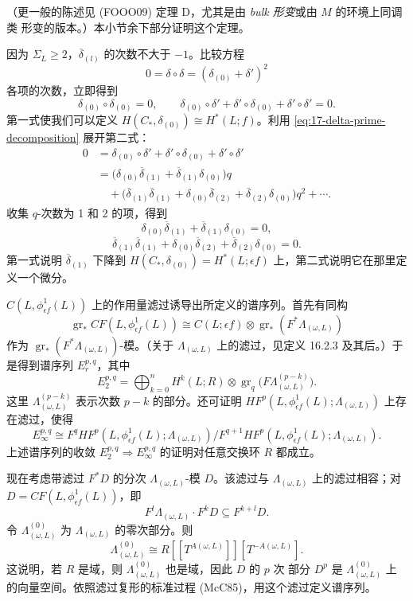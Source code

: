 （更一般的陈述见 (FOOO09) 定理 D，尤其是由 \emph{bulk 形变}或由 $M$ 的环境上同调类
形变的版本。）本小节余下部分证明这个定理。

因为 $\Sigma_L\geq2$，$\overline\delta_{(l)}$ 的次数不大于 $-1$。比较方程
\[
 0=\delta\circ\delta=(\delta_{(0)}+\delta')^2
\]
各项的次数，立即得到
\[
 \delta_{(0)}\circ\delta_{(0)}=0,
 \qquad
 \delta_{(0)}\circ\delta'+\delta'\circ\delta_{(0)}
 +\delta'\circ\delta'=0.
\]
第一式使我们可以定义
$H(C_*,\delta_{(0)})\cong H^*(L;f)$。利用
\eqref{eq:17-delta-prime-decomposition} 展开第二式：
\[
 \begin{aligned}
 0&=\delta_{(0)}\circ\delta'+\delta'\circ\delta_{(0)}
 +\delta'\circ\delta'\\
 &=\bigl(\delta_{(0)}\overline\delta_{(1)}
 +\overline\delta_{(1)}\delta_{(0)}\bigr)q\\
 &\quad+\bigl(\overline\delta_{(1)}\overline\delta_{(1)}
 +\delta_{(0)}\overline\delta_{(2)}
 +\overline\delta_{(2)}\delta_{(0)}\bigr)q^2+\cdots.
 \end{aligned}
\]
收集 $q$-次数为 1 和 2 的项，得到
\[
 \delta_{(0)}\overline\delta_{(1)}+
 \overline\delta_{(1)}\delta_{(0)}=0,
\]
\[
 \overline\delta_{(1)}\overline\delta_{(1)}
 +\delta_{(0)}\overline\delta_{(2)}
 +\overline\delta_{(2)}\delta_{(0)}=0.
\]
第一式说明 $\overline\delta_{(1)}$ 下降到
$H(C_*,\delta_{(0)})=H^*(L;\epsilon f)$ 上，第二式说明它在那里定义一个微分。

$C(L,\phi_{\epsilon f}^1(L))$ 上的作用量滤过诱导出所定义的谱序列。首先有同构
\[
 \operatorname{gr}_*CF(L,\phi_{\epsilon f}^1(L))
 \cong C(L;\epsilon f)\otimes
 \operatorname{gr}_*(F^*\Lambda_{(\omega,L)})
\]
作为 $\operatorname{gr}_*(F^*\Lambda_{(\omega,L)})$-模。（关于
$\Lambda_{(\omega,L)}$ 上的滤过，见定义 16.2.3 及其后。）于是得到谱序列
$E_r^{p,q}$，其中
\begin{equation}
 E_2^{p,q}=\bigoplus_{k=0}^n H^k(L;R)\otimes
 \operatorname{gr}_q\bigl(F\Lambda_{(\omega,L)}^{(p-k)}\bigr).
\label{eq:17-spectral-sequence-E2}
\end{equation}
这里 $\Lambda_{(\omega,L)}^{(p-k)}$ 表示次数 $p-k$ 的部分。还可证明
$HF^p(L,\phi_{\epsilon f}^1(L);\Lambda_{(\omega,L)})$ 上存在滤过，使得
\[
 E_\infty^{p,q}\cong
 F^qHF^p(L,\phi_{\epsilon f}^1(L);\Lambda_{(\omega,L)})
 /F^{q+1}HF^p(L,\phi_{\epsilon f}^1(L);\Lambda_{(\omega,L)}).
\]
上述谱序列的收敛 $E_2^{p,q}\Longrightarrow E_\infty^{p,q}$ 的证明对任意交换环
$R$ 都成立。

现在考虑带滤过 $F^*D$ 的分次 $\Lambda_{(\omega,L)}$-模 $D$。该滤过与
$\Lambda_{(\omega,L)}$ 上的滤过相容；对
$D=CF(L,\phi_{\epsilon f}^1(L))$，即
\[
 F^l\Lambda_{(\omega,L)}\cdot F^kD\subseteq F^{k+l}D.
\]
令 $\Lambda_{(\omega,L)}^{(0)}$ 为 $\Lambda_{(\omega,L)}$ 的零次部分。则
\[
 \Lambda_{(\omega,L)}^{(0)}
 \cong R[[T^{A(\omega,L)}]][T^{-A(\omega,L)}].
\]
这说明，若 $R$ 是域，则 $\Lambda_{(\omega,L)}^{(0)}$ 也是域，因此 $D$ 的 $p$ 次
部分 $D^p$ 是 $\Lambda_{(\omega,L)}^{(0)}$ 上的向量空间。依照滤过复形的标准过程
(McC85)，用这个滤过定义谱序列。

